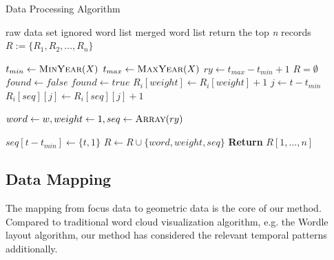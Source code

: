 \documentclass[12pt]{iopart}
\newcommand{\Desc}[2]{\State \makebox[2em][l]{#1}#2}
\begin{document}
\begin{algorithm}
	\caption{Data Processing Algorithm}
	\label{alg:data-process}
	\begin{algorithmic}[1]
	
\Input
\Desc{X}{raw data set}
\Desc{P}{ignored word list}
\Desc{M}{merged word list}
\Desc{n}{return the top \textit{n} records}
\EndInput
\Output
\Desc{R}{$ R := \{R_1,R_2,...,R_n\}$} 
 \\
\EndOutput

\State $t_{min} \gets \Call{MinYear}{X}$
\State $t_{max} \gets \Call{MaxYear}{X}$
\State $ry \gets t_{max} - t_{min} + 1$
\State $R = \emptyset$
		\EndIf
				\State $found \gets false $
						\State $found \gets true $
						\State $R_i[weight] \gets R_i[weight] + 1$
						\State $j \gets t-t_{min}$
						\State $R_i[seq][j] \gets R_i[seq][j] + 1$
					\EndIf
					
				\EndFor
				\State $word \gets w, weight \gets 1, seq \gets \Call{Array}{ry}$
				
				\State $seq[t-t_{min}] \gets \{t,1\}$
				\State $ R \gets R \cup \{word,weight,seq\} $
				\EndIf
			\EndIf
		\EndFor
	\EndFor
\EndFor
\State {}
\State \textbf{Return} $R[1,...,n]$ 
\EndProcedure

\end{algorithmic}
\end{algorithm}


\subsection{Data Mapping}

The mapping from focus data to geometric data is the core of our method. Compared to traditional word cloud visualization algorithm, e.g. the Wordle layout algorithm, our method has considered the relevant temporal patterns additionally.
\end{document}
